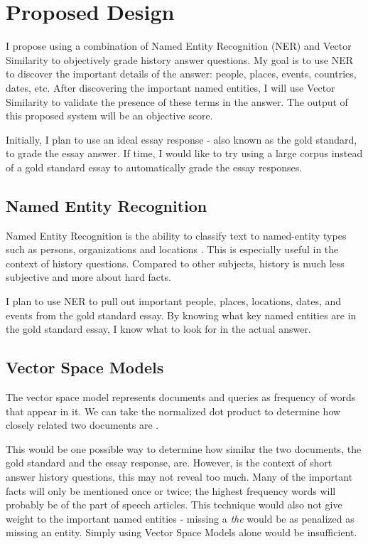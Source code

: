 \section{Proposed Design}
\label{section:propeseddesign}
I propose using a combination of Named Entity Recognition (NER) and Vector Similarity to objectively grade history answer questions. My goal is to use NER to discover the important details of the answer: people, places, events, countries, dates, etc. After discovering the important named entities, I will use Vector Similarity to validate the presence of these terms in the answer. The output of this proposed system will be an objective score.

Initially, I plan to use an ideal essay response - also known as the gold standard, to grade the essay answer. If time, I would like to try using a large corpus instead of a gold standard essay to automatically grade the essay responses.

\subsection{Named Entity Recognition}
 Named Entity Recognition is the ability to classify text to named-entity types such as persons, organizations and locations \cite{recognizing_named_entities_in_tweets}. This is especially useful in the context of history questions. Compared to other subjects, history is much less subjective and more about hard facts.

 I plan to use NER to pull out important people, places, locations, dates, and events from the gold standard essay. By knowing what key named entities are in the gold standard essay, I know what to look for in the actual answer.

 \subsection{Vector Space Models}
The vector space model represents documents and queries as frequency of words that appear in it. We can take the normalized dot product to determine how closely related two documents are \cite{the_book}.

This would be one possible way to determine how similar the two documents, the gold standard and the essay response, are. However, is the context of short answer history questions, this may not reveal too much. Many of the important facts will only be mentioned once or twice; the highest frequency words will probably be of the part of speech articles. This technique would also not give weight to the important named entities - missing a \textit{the} would be as penalized as missing an entity. Simply using Vector Space Models alone would be insufficient.

